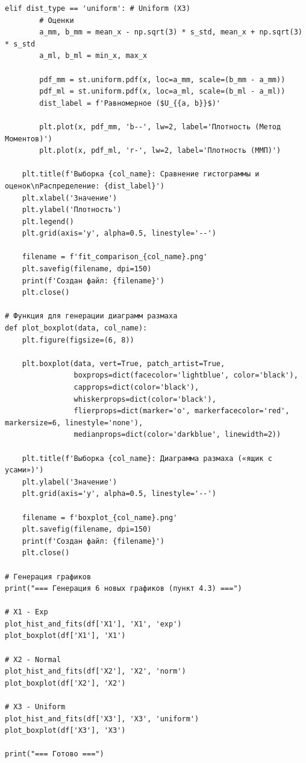 \documentclass[a4paper,12pt]{article}
\begin{document}
\begin{lstlisting}[style=mypython, caption={Содержание файла 8\_plots\_generation.py}]
    elif dist_type == 'uniform': # Uniform (X3)
        # Оценки
        a_mm, b_mm = mean_x - np.sqrt(3) * s_std, mean_x + np.sqrt(3) * s_std
        a_ml, b_ml = min_x, max_x
        
        pdf_mm = st.uniform.pdf(x, loc=a_mm, scale=(b_mm - a_mm))
        pdf_ml = st.uniform.pdf(x, loc=a_ml, scale=(b_ml - a_ml))
        dist_label = f'Равномерное ($U_{{a, b}}$)'
        
        plt.plot(x, pdf_mm, 'b--', lw=2, label='Плотность (Метод Моментов)')
        plt.plot(x, pdf_ml, 'r-', lw=2, label='Плотность (ММП)')

    plt.title(f'Выборка {col_name}: Сравнение гистограммы и оценок\nРаспределение: {dist_label}')
    plt.xlabel('Значение')
    plt.ylabel('Плотность')
    plt.legend()
    plt.grid(axis='y', alpha=0.5, linestyle='--')
    
    filename = f'fit_comparison_{col_name}.png'
    plt.savefig(filename, dpi=150)
    print(f'Создан файл: {filename}')
    plt.close()

# Функция для генерации диаграмм размаха
def plot_boxplot(data, col_name):
    plt.figure(figsize=(6, 8))
    
    plt.boxplot(data, vert=True, patch_artist=True,
                boxprops=dict(facecolor='lightblue', color='black'),
                capprops=dict(color='black'),
                whiskerprops=dict(color='black'),
                flierprops=dict(marker='o', markerfacecolor='red', markersize=6, linestyle='none'),
                medianprops=dict(color='darkblue', linewidth=2))
    
    plt.title(f'Выборка {col_name}: Диаграмма размаха («ящик с усами»)')
    plt.ylabel('Значение')
    plt.grid(axis='y', alpha=0.5, linestyle='--')
    
    filename = f'boxplot_{col_name}.png'
    plt.savefig(filename, dpi=150)
    print(f'Создан файл: {filename}')
    plt.close()

# Генерация графиков
print("=== Генерация 6 новых графиков (пункт 4.3) ===")

# X1 - Exp
plot_hist_and_fits(df['X1'], 'X1', 'exp')
plot_boxplot(df['X1'], 'X1')

# X2 - Normal
plot_hist_and_fits(df['X2'], 'X2', 'norm')
plot_boxplot(df['X2'], 'X2')

# X3 - Uniform
plot_hist_and_fits(df['X3'], 'X3', 'uniform')
plot_boxplot(df['X3'], 'X3')

print("=== Готово ===")
\end{lstlisting}
\end{document}
